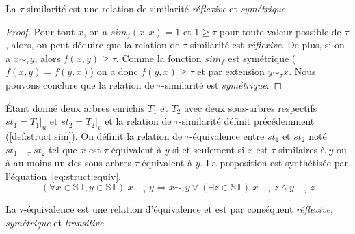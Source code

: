\begin{proposition}
    La $\tau$-similarité est une relation de similarité \emph{réflexive} et \emph{symétrique}.
\end{proposition}

\begin{proof}
    Pour tout $x$, on a $sim_f(x, x) = 1$ et $1 \ge \tau$ pour toute valeur possible de $\tau$, alors, on peut déduire que la relation de $\tau$-similarité est \emph{réflexive}.
    De plus, si on a $x \sim_\tau y$, alors $f(x, y) \ge \tau$.
    Comme la fonction $sim_f$ est symétrique ($f(x, y) = f(y, x)$) on a donc $f(y, x) \ge \tau$ et par extension $y \sim_\tau x$.
    Nous pouvons conclure que la relation de $\tau$-similarité est \emph{symétrique}.
\end{proof}

\begin{definition}
    \label{def:struct:equiv}
    Étant donné deux arbres enrichis $T_1$ et $T_2$ avec deux sous-arbres respectifs $st_1 = T_1|_u$ et $st_2 = T_2|_v$ et la relation de $\tau$-similarité définit précédemment (\ref{def:struct:sim}).
    On définit la relation de $\tau$-équivalence entre $st_1$ et $st_2$ noté $st_1 \equiv_\tau st_2$ tel que $x$ est $\tau$-équivalent à $y$ si et seulement si $x$ est $\tau$-similaires à $y$ ou à au moins un des sous-arbres $\tau$-équivalent à $y$.
    La proposition est synthétisée par l'équation~\ref{eq:struct:equiv}.
    \begin{equation}
        (\forall x \in \mathbb{ST}, y \in \mathbb{ST}) ~ x \equiv_\tau y \iff x \sim_\tau y \lor (\exists z \in \mathbb{ST}) ~ x \equiv_\tau z \land y \equiv_\tau z \label{eq:struct:equiv}
    \end{equation}
\end{definition}

\begin{proposition}
    La $\tau$-équivalence est une relation d'équivalence et est par conséquent \emph{réflexive}, \emph{symétrique} et \emph{transitive}.
\end{proposition}

